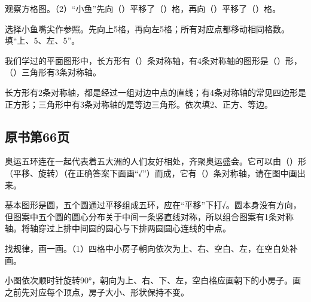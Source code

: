 观察方格图。（2）“小鱼”先向（\hspace{1.8em}）平移了（\hspace{1.8em}）格，再向（\hspace{1.8em}）平移了（\hspace{1.8em}）格。\par
{}
\begin{BookAnswer}
选择小鱼嘴尖作参照。先向上5格，再向左5格；所有对应点都移动相同格数。填“上、5、左、5”。
\end{BookAnswer}

我们学过的平面图形中，长方形有（\hspace{1.8em}）条对称轴，有4条对称轴的图形是（\hspace{1.8em}）形，（\hspace{1.8em}）三角形有3条对称轴。\par
\begin{BookAnswer}
长方形有2条对称轴，都是经过一组对边中点的直线；有4条对称轴的常见四边形是正方形；三角形中有3条对称轴的是等边三角形。依次填2、正方、等边。
\end{BookAnswer}



\subsection*{原书第66页}

奥运五环连在一起代表着五大洲的人们友好相处，齐聚奥运盛会。它可以由（\hspace{1.8em}）形（平移、旋转）（在正确答案下面画“√”）而成，它有（\hspace{1.8em}）条对称轴，请在图中画出来。\par
{}
\begin{BookAnswer}
基本图形是圆，五个圆通过平移组成五环，应在“平移”下打√。圆本身没有方向，但图案中五个圆的圆心分布关于中间一条竖直线对称，所以组合图案有1条对称轴。将轴穿过上排中间圆的圆心与下排两圆圆心连线的中点。
\end{BookAnswer}

找规律，画一画。（1）四格中小房子朝向依次为上、右、空白、左，在空白处补画。\par
{}
\begin{BookAnswer}
小图依次顺时针旋转90°，朝向为上、右、下、左，空白格应画朝下的小房子。画之前先对应每个顶点，房子大小、形状保持不变。
\end{BookAnswer}

